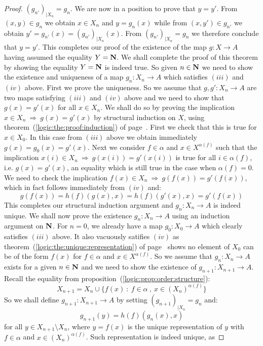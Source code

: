 \begin{proof}
$(g_{n'})_{|X_{n}}=g_{n}$. We are now in a position to prove that
$y=y'$. From $(x,y)\in g_{n}$ we obtain $x\in X_{n}$ and
$y=g_{n}(x)$ while from $(x,y')\in g_{n'}$ we obtain $y'=g_{n'}(x) =
(g_{n'})_{|X_{n}}(x)$. From $(g_{n'})_{|X_{n}}=g_{n}$ we therefore
conclude that $y=y'$. This completes our proof of the existence of
the map $g:X\to A$ having assumed the equality $Y=\mbox{$\bf N$}$. We shall
complete the proof of this theorem by showing the equality $Y=\mbox{$\bf N$}$ is
indeed true. So given $n\in\mbox{$\bf N$}$ we need to show the existence and
uniqueness of a map $g_{n}:X_{n}\to A$ which satisfies $(iii)$ and
$(iv)$ above. First we prove the uniqueness. So we assume that
$g,g':X_{n}\to A$ are two maps satisfying $(iii)$ and $(iv)$ above
and we need to show that $g(x) = g'(x)$ for all $x\in X_{n}$. We
shall do so by proving the implication $x\in X_{n}\ \Rightarrow\
g(x)=g'(x)$ by structural induction on $X$, using
theorem~(\ref{logic:the:proof:induction}) of
page~\pageref{logic:the:proof:induction}. First we check that this
is true for $x\in X_{0}$. In this case from $(iii)$ above we obtain
immediately $g(x)=g_{0}(x)=g'(x)$. Next we consider $f\in\alpha$ and
$x\in X^{\alpha(f)}$ such that the implication $x(i)\in X_{n}\
\Rightarrow\ g(x(i))=g'(x(i))$ is true for all $i\in\alpha(f)$, i.e.
$g(x)=g'(x)$, an equality which is still true in the case when
$\alpha(f)=0$. We need to check the implication $f(x)\in X_{n}\
\Rightarrow\ g(f(x))=g'(f(x))$,  which in fact follows immediately
from $(iv)$ and:
    \[
    g(f(x))=h(f)(g(x),x)=h(f)(g'(x),x)=g'(f(x))
    \]
This completes our structural induction argument and $g_{n}:X_{n}\to
A$ is indeed unique. We shall now prove the existence
$g_{n}:X_{n}\to A$ using an induction argument on $\mbox{$\bf N$}$. For $n=0$,
we already have a map $g_{0}:X_{0}\to A$ which clearly satisfies
$(iii)$ above. It also vacuously satifies $(iv)$ as
theorem~(\ref{logic:the:unique:representation}) of
page~\pageref{logic:the:unique:representation} shows no element of
$X_{0}$ can be of the form $f(x)$ for $f\in\alpha$ and $x\in
X^{\alpha(f)}$. So we assume that $g_{n}:X_{n}\to A$ exists for a
given $n\in\mbox{$\bf N$}$ and we need to show the existence of
$g_{n+1}:X_{n+1}\to A$. Recall the equality from
proposition~(\ref{logic:prop:order:structure}):
    \[
    X_{n+1}=X_{n}\cup\{f(x)\ :\ f\in\alpha\ ,\
    x\in(X_{n})^{\alpha(f)}\}
    \]
So we shall define $g_{n+1}:X_{n+1}\to A$ by setting
$(g_{n+1})_{|X_{n}}=g_{n}$ and:
     \[
     g_{n+1}(y) = h(f)(g_{n}(x),x)
     \]
for all $y\in X_{n+1}\setminus X_{n}$, where $y = f(x)$ is the
unique representation of $y$ with $f\in\alpha$ and
$x\in(X_{n})^{\alpha(f)}$. Such representation is indeed unique, as

\end{proof}
